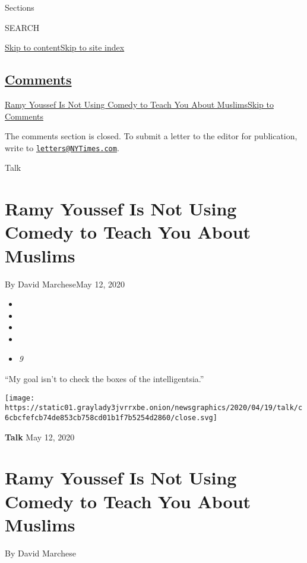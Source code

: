Sections

SEARCH

\protect\hyperlink{site-content}{Skip to
content}\protect\hyperlink{site-index}{Skip to site index}

\hypertarget{comments}{%
\subsection{\texorpdfstring{\protect\hyperlink{commentsContainer}{Comments}}{Comments}}\label{comments}}

\href{}{Ramy Youssef Is Not Using Comedy to Teach You About
Muslims}\href{}{Skip to Comments}

The comments section is closed. To submit a letter to the editor for
publication, write to
\href{mailto:letters@NYTimes.com}{\nolinkurl{letters@NYTimes.com}}.

Talk

\hypertarget{ramy-youssef-is-not-using-comedy-to-teach-you-about-muslims}{%
\section{Ramy Youssef Is Not Using Comedy to Teach You About
Muslims}\label{ramy-youssef-is-not-using-comedy-to-teach-you-about-muslims}}

By David MarcheseMay 12, 2020

\begin{itemize}
\item
\item
\item
\item
\item
  \emph{9}
\end{itemize}

``My goal isn't to check the boxes of the intelligentsia.''

\texttt{[image: https://static01.graylady3jvrrxbe.onion/newsgraphics/2020/04/19/talk/c6cbcfefcb74de853cb758cd01b1f7b5254d2860/close.svg]}

\textbf{Talk} May 12, 2020

\hypertarget{ramy-youssef-is-not-using-comedy-to-teach-you-about-muslims-1}{%
\section{Ramy Youssef Is Not Using Comedy to Teach You About
Muslims}\label{ramy-youssef-is-not-using-comedy-to-teach-you-about-muslims-1}}

By David Marchese

